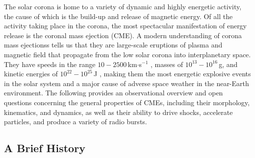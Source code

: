 
The solar corona is home to a variety of dynamic and highly energetic activity, the cause of which is the build-up and release of magnetic energy. Of all the activity taking place in the corona, the most spectacular manifestation of energy release is the coronal mass ejection (CME). A modern understanding of corona mass ejectionss tells us that they are large-scale eruptions of plasma and magnetic field that propagate from the low solar corona into interplanetary space. They have speeds in the range $10-2500$\,km$\cdot$s$^{-1}$ \citep{gopal2004}, masses of $10^{13}-10^{16}$\,g, and kinetic energies of $10^{22} - 10^{25}$\,J \citep{vour2010}, making them the most energetic explosive events in the solar system and a major cause of adverse space weather in the near-Earth environment. The following provides an observational overview and open questions concerning the general properties of CMEs, including their morphology, kinematics, and dynamics, as well as their ability to drive shocks, accelerate particles, and produce a variety of radio bursts.

\subsection{A Brief History}\label{sec:20}

